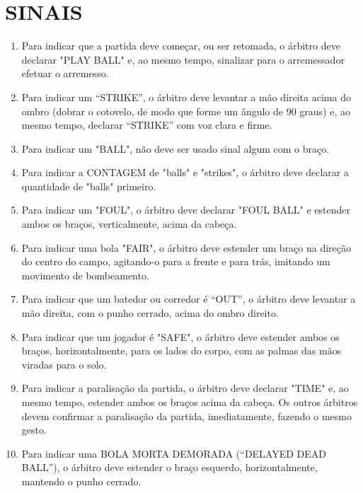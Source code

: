 \section{SINAIS}
\begin{multicols}{2}  
	\begin{enumerate}[label=\alph*)]
		\item Para indicar que a partida deve começar, ou ser retomada, o árbitro deve declarar "PLAY BALL" e, ao mesmo tempo, sinalizar para o arremessador efetuar o arremesso. 
		
		\item  Para indicar um “STRIKE”, o árbitro deve levantar a mão direita acima do ombro (dobrar o cotovelo, de modo que forme um ângulo de 90 graus) e, ao mesmo tempo, declarar “STRIKE” com voz clara e firme. 
		
		\item  Para indicar um "BALL", não deve ser usado sinal algum com o braço. 
		
		\item  Para indicar a CONTAGEM de "balls" e "strikes", o árbitro deve declarar a quantidade de "balls" primeiro. 
		
		\item  Para indicar um "FOUL", o árbitro deve declarar "FOUL BALL" e estender ambos os braços, verticalmente, acima da cabeça. 
		
		\item  Para indicar uma bola "FAIR", o árbitro deve estender um braço na direção do centro do campo, agitando-o para a frente e para trás, imitando um movimento de bombeamento. 
		
		\item  Para indicar que um batedor ou corredor é “OUT”, o árbitro deve levantar a mão direita, com o punho cerrado, acima do ombro direito. 
		
		\item  Para indicar que um jogador é "SAFE", o árbitro deve estender ambos os braços, horizontalmente, para os lados do corpo, com as palmas das mãos viradas para o solo. 
		
		\item  Para indicar a paralisação da partida, o árbitro deve declarar "TIME" e, ao mesmo tempo, estender ambos os braços acima da cabeça. Os outros árbitros devem confirmar a paralisação da partida, imediatamente, fazendo o mesmo gesto. 
		
		\item  Para indicar uma BOLA MORTA DEMORADA (“DELAYED DEAD BALL”), o árbitro deve estender o braço esquerdo, horizontalmente, mantendo o punho cerrado. 
		

\end{enumerate}
\end{multicols}
